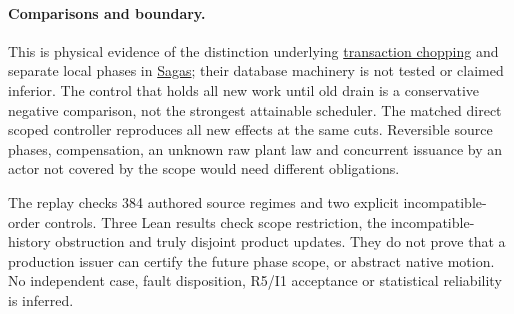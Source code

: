 \documentclass[11pt]{article}
\begin{document}
\paragraph{Comparisons and boundary.}
This is physical evidence of the distinction underlying
\href{https://cs.nyu.edu/~shasha/papers/chopping.pdf}
{transaction chopping} and separate local phases in
\href{https://www.cs.princeton.edu/techreports/1987/070.pdf}
{Sagas}; their database machinery is not tested or claimed inferior.
The control that holds all new work until old drain is a
conservative negative comparison, not the strongest attainable
scheduler. The matched direct scoped controller reproduces all
new effects at the same cuts. Reversible source phases, compensation,
an unknown raw plant law and concurrent issuance by an actor
not covered by the scope would need different obligations.

The replay checks 384 authored source regimes and two explicit
incompatible-order controls. Three Lean results check scope
restriction, the incompatible-history obstruction and truly
disjoint product updates. They do not prove that a production
issuer can certify the future phase scope, or abstract native motion.
No independent case, fault disposition, R5/I1 acceptance or
statistical reliability is inferred.
\end{document}

